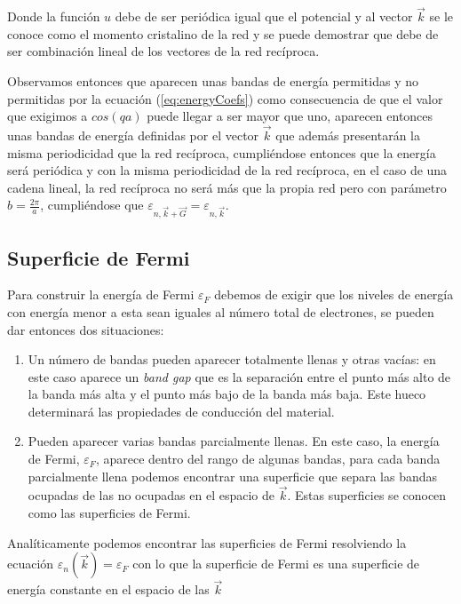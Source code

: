 \documentclass{article} %
\begin{document}
Donde la función $u$ debe de ser periódica igual que el potencial y al vector $\vec{k}$ se le conoce como el momento cristalino de la red y se puede demostrar que debe de ser combinación lineal de los vectores de la red recíproca.

Observamos entonces que aparecen unas bandas de energía permitidas y no permitidas por la ecuación (\ref{eq:energyCoefs}) como consecuencia de que el valor que exigimos a $cos(qa)$ puede llegar a ser mayor que uno, aparecen entonces unas bandas de energía definidas por el vector $\vec{k}$ que además presentarán la misma periodicidad que la red recíproca, cumpliéndose entonces que la energía será periódica y con la misma periodicidad de la red recíproca, en el caso de una cadena lineal, la red recíproca no será más que la propia red pero con parámetro $b = \frac{2\pi}{a}$, cumpliéndose que $\varepsilon_{n, \vec{k}+\vec{G}} = \varepsilon_{n, \vec{k}}$.

\subsection{Superficie de Fermi}

Para construir la energía de Fermi $\varepsilon_F$ debemos de exigir que los niveles de energía con energía menor a esta sean iguales al número total de electrones, se pueden dar entonces dos situaciones:

\begin{enumerate}
\item Un número de bandas pueden aparecer totalmente llenas y otras vacías: en este caso aparece un \textit{band gap} que es la separación entre el punto más alto de la banda más alta y el punto más bajo de la banda más baja. Este hueco determinará las propiedades de conducción del material.
\item Pueden aparecer varias bandas parcialmente llenas. En este caso, la energía de Fermi, $\varepsilon_F$, aparece dentro del rango de algunas bandas, para cada banda parcialmente llena podemos encontrar una superficie que separa las bandas ocupadas de las no ocupadas en el espacio de $\vec{k}$. Estas superficies se conocen como las superficies de Fermi.
\end{enumerate}

Analíticamente podemos encontrar las superficies de Fermi resolviendo la ecuación $\varepsilon_n(\vec{k}) = \varepsilon_F$ con lo que la superficie de Fermi es una superficie de energía constante en el espacio de las $\vec{k}$
\end{document}
